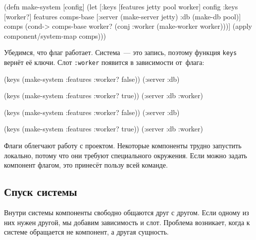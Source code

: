 \else

\begin{english}
  \begin{clojure}
(defn make-system [config]
  (let [{:keys [features jetty pool worker]} config
        {:keys [worker?]} features
        comps-base [:server (make-server jetty)
                    :db (make-db pool)]
        comps (cond-> comps-base
                worker?
                (conj :worker (make-worker worker)))]
    (apply component/system-map comps)))
  \end{clojure}
\end{english}

\fi

Убедимся, что флаг работает. Система~--- это запись, поэтому функция \verb|keys|
вернёт её ключи. Слот \verb|:worker| появится в зависимости от~флага:

\ifx\DEVICETYPE\MOBILE

\begin{english}
  \begin{clojure}
(keys (make-system
        {:features {:worker? false}}))
(:server :db)

(keys (make-system
        {:features {:worker? true}}))
(:server :db :worker)
  \end{clojure}
\end{english}

\else

\begin{english}
  \begin{clojure}
(keys (make-system {:features {:worker? false}}))
(:server :db)

(keys (make-system {:features {:worker? true}}))
(:server :db :worker)
  \end{clojure}
\end{english}

\fi

Флаги облегчают работу с проектом. Некоторые компоненты трудно запустить
локально, потому что они требуют специального окружения. Если можно задать
компонент флагом, это принесёт пользу всей команде.

\subsection{Спуск системы}


Внутри системы компоненты свободно общаются друг с другом. Если одному из них
нужен другой, мы добавим зависимость и слот. Проблема возникает, когда к системе
обращается не компонент, а другая сущность.

